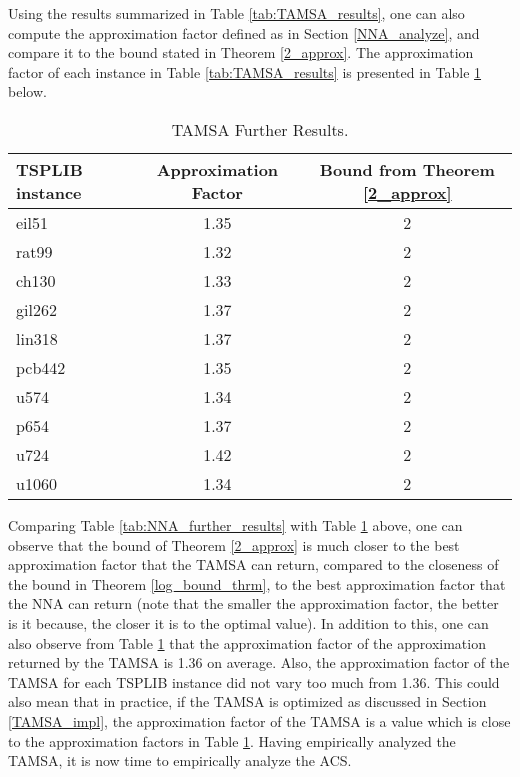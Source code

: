 \documentclass{article}
\begin{document}
Using the results summarized in Table \ref{tab:TAMSA_results}, one can also compute the approximation factor defined as in Section \ref{NNA_analyze}, and compare it to the bound stated in Theorem \ref{2_approx}. The approximation factor of each instance in Table \ref{tab:TAMSA_results} is presented in Table \ref{tab:Tamsa_further} below.
\begin{table}[H]
    \caption{TAMSA Further Results.}
    \label{tab:Tamsa_further}
    \begin{tabular}{l|c|c} %
      \textbf{TSPLIB instance} & \textbf{Approximation Factor} & \textbf{Bound from Theorem \ref{2_approx}}\\
      \hline
    eil51 & 1.35 & 2\\
    rat99 & 1.32  & 2\\
    ch130 & 1.33 & 2  \\
    gil262 & 1.37 & 2  \\
    lin318 & 1.37   &  2  \\
    pcb442 & 1.35 & 2 \\
    u574 & 1.34  & 2 \\ 
    p654 & 1.37 & 2 \\
    u724 & 1.42 & 2 \\
    u1060 & 1.34 & 2  \\
    \end{tabular}
\end{table}
Comparing Table \ref{tab:NNA_further_results} with Table \ref{tab:Tamsa_further} above, one can observe that the bound of Theorem \ref{2_approx} is much closer to the best approximation factor that the TAMSA can return, compared to the closeness of the bound in Theorem \ref{log_bound_thrm}, to the best approximation factor that the NNA can return (note that the smaller the approximation factor, the better is it because, the closer it is to the optimal value). In addition to this, one can also observe from Table \ref{tab:Tamsa_further} that the approximation factor of the approximation returned by the TAMSA is 1.36 on average. Also, the approximation factor of the TAMSA for each TSPLIB instance did not vary too much from 1.36. This could also mean that in practice, if the TAMSA is optimized as discussed in Section \ref{TAMSA_impl}, the approximation factor of the TAMSA is a value which is close to the approximation factors in Table \ref{tab:Tamsa_further}. Having empirically analyzed the TAMSA, it is now time to empirically analyze the ACS.
\end{document}

